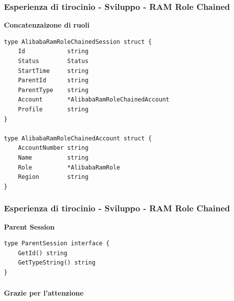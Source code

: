 \documentclass{beamer}
\begin{document}
\begin{frame}[fragile]
 \frametitle{Esperienza di tirocinio - Sviluppo - RAM Role Chained}
 \centering
 \textbf{Concatenzaizone di ruoli}\\
 \begin{lstlisting}[style=customgo, caption=alibaba\_ram\_role\_chained\_session.go (righe 9-29), captionpos=b, firstnumber=9]
type AlibabaRamRoleChainedSession struct {
	Id            string
	Status        Status
	StartTime     string
	ParentId      string
	ParentType    string
	Account       *AlibabaRamRoleChainedAccount
	Profile       string
}

type AlibabaRamRoleChainedAccount struct {
	AccountNumber string
	Name          string
	Role          *AlibabaRamRole
	Region        string
}
 \end{lstlisting}
\end{frame}

\begin{frame}[fragile]
 \frametitle{Esperienza di tirocinio - Sviluppo - RAM Role Chained}
 \centering
 \textbf{Parent Session}\\
 \begin{lstlisting}[style=customgo, caption=parent\_interface.go (righe 3-6), captionpos=b, firstnumber=3]
type ParentSession interface {
	GetId() string
	GetTypeString() string
}
 \end{lstlisting}
\end{frame}

\begin{frame}
 \frametitle{}
 \centering
 \textbf{Grazie per l'attenzione}\\
\end{frame}
\end{document}
